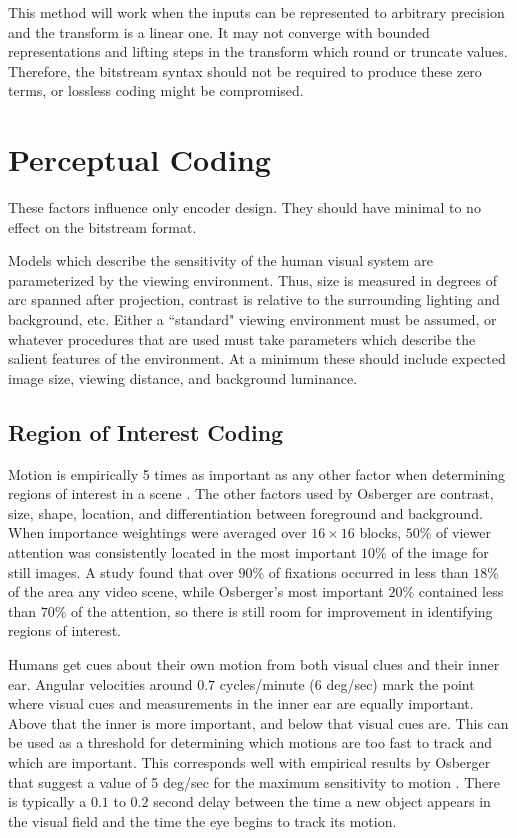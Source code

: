 \documentclass[11pt,letterpaper]{article}
\begin{document}
This method will work when the inputs can be represented to arbitrary precision
 and the transform is a linear one.
It may not converge with bounded representations and lifting steps in the
 transform which round or truncate values.
Therefore, the bitstream syntax should not be required to produce these zero
 terms, or lossless coding might be compromised.

\section{Perceptual Coding}

These factors influence only encoder design.
They should have minimal to no effect on the bitstream format.

Models which describe the sensitivity of the human visual system are
 parameterized by the viewing environment.
Thus, size is measured in degrees of arc spanned after projection, contrast is
 relative to the surrounding lighting and background, etc.
Either a ``standard" viewing environment must be assumed, or whatever
 procedures that are used must take parameters which describe the salient
 features of the environment.
At a minimum these should include expected image size, viewing distance, and
 background luminance.

\subsection{Region of Interest Coding}

Motion is empirically 5 times as important as any other factor when determining
 regions of interest in a scene \cite{Osb99, NC96}.
The other factors used by Osberger are contrast, size, shape, location, and
 differentiation between foreground and background.
When importance weightings were averaged over $16\times 16$ blocks, $50\%$ of
 viewer attention was consistently located in the most important $10\%$ of the
 image for still images.
A study found that over $90\%$ of fixations occurred in less than $18\%$ of the
 area any video scene, while Osberger's most important $20\%$ contained less
 than $70\%$ of the attention, so there is still room for improvement in
 identifying regions of interest.

Humans get cues about their own motion from both visual clues and their inner
 ear.
Angular velocities around $0.7$ cycles/minute (6 deg/sec) mark the point where
 visual cues and measurements in the inner ear are equally important.
Above that the inner is more important, and below that visual cues are.
This can be used as a threshold for determining which motions are too fast to
 track and which are important.
This corresponds well with empirical results by Osberger that suggest a value
 of 5 deg/sec for the maximum sensitivity to motion \cite{Osb99}.
There is typically a $0.1$ to $0.2$ second delay between the time a new object
 appears in the visual field and the time the eye begins to track its motion.
\end{document}
